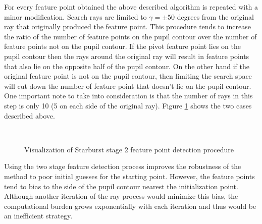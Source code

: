 \documentclass[12pt,fleqn]{book} %
\begin{document}
For every feature point obtained the above described algorithm is repeated with a minor modification. Search rays are limited to $\gamma = \pm 50$ degrees from the original ray that originally produced the feature point. This procedure tends to increase the ratio of the number of feature points on the pupil contour over the number of feature points not on the pupil contour. If the pivot feature point lies on the pupil contour then the rays around the original ray will result in feature points that also lie on the opposite half of the pupil contour. On the other hand if the original feature point is not on the pupil contour, then limiting the search space will cut down the number of feature point that doesn't lie on the pupil contour. One important note to take into consideration is that the number of rays in this step is only 10 (5 on each side of the original ray). Figure \ref{fig:starburst_stage2_example} shows the two cases described above. \bigskip



\begin{figure}[h]
\begin{dBox}
\centering
  \mbox{
   }
   \caption{Visualization of Starburst stage 2 feature point detection procedure \label{fig:starburst_stage2_example} }   
\end{dBox}   
\end{figure}

Using the two stage feature detection process improves the robustness of the method to poor initial guesses for the starting point. However, the feature points tend to bias to the side of the pupil contour nearest the initialization point. Although another iteration of the ray process would minimize this bias, the computational burden grows exponentially with each iteration and thus would be an inefficient strategy. \bigskip
\end{document}
